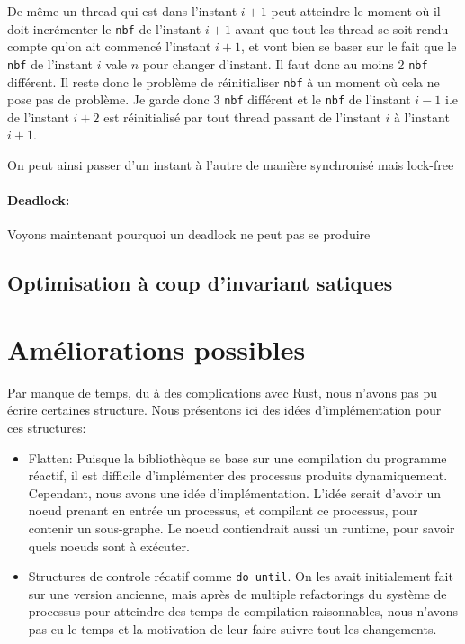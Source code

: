 \documentclass[a4paper]{article}
\renewcommand{\(}{\left(}
\renewcommand{\)}{\right)}
\begin{document}
De même un thread qui est dans l'instant $i+1$ peut atteindre le moment où il
doit incrémenter le \verb!nbf! de l'instant $i+1$ avant que tout les thread se
soit rendu compte qu'on ait commencé l'instant $i+1$, et vont bien se baser sur
le fait que le \verb!nbf! de l'instant $i$ vale $n$ pour changer d'instant. Il
faut donc au moins 2 \verb!nbf! différent. Il reste donc le problème de
réinitialiser \verb!nbf! à un moment où cela ne pose pas de problème. Je garde
donc 3 \verb!nbf! différent et le \verb!nbf! de l'instant $i-1$ i.e de l'instant
$i+2$ est réinitialisé par tout thread passant de l'instant $i$ à l'instant $i+1$.

On peut ainsi passer d'un instant à l'autre de manière synchronisé mais lock-free

\paragraph{Deadlock:} Voyons maintenant pourquoi un deadlock ne peut pas se produire


\subsection{Optimisation à coup d'invariant satiques}

\section{Améliorations possibles}

Par manque de temps, du à des complications avec Rust, nous n'avons pas pu
écrire certaines structure. Nous présentons ici des idées d'implémentation pour
ces structures:

\begin{itemize}
\item Flatten: Puisque la bibliothèque se base sur une compilation du programme
  réactif, il est difficile d'implémenter des processus produits dynamiquement.
  Cependant, nous avons une idée d'implémentation. L'idée serait d'avoir un
  noeud prenant en entrée un processus, et compilant ce processus, pour contenir
  un sous-graphe. Le noeud contiendrait aussi un runtime, pour savoir quels
  noeuds sont à exécuter.
\item Structures de controle récatif comme \verb!do until!. On les avait
  initialement fait sur une version ancienne, mais après de multiple refactorings
  du système de processus pour atteindre des temps de compilation raisonnables,
  nous n'avons pas eu le temps et la motivation de leur faire suivre tout les changements.
\end{itemize}
\end{document}
